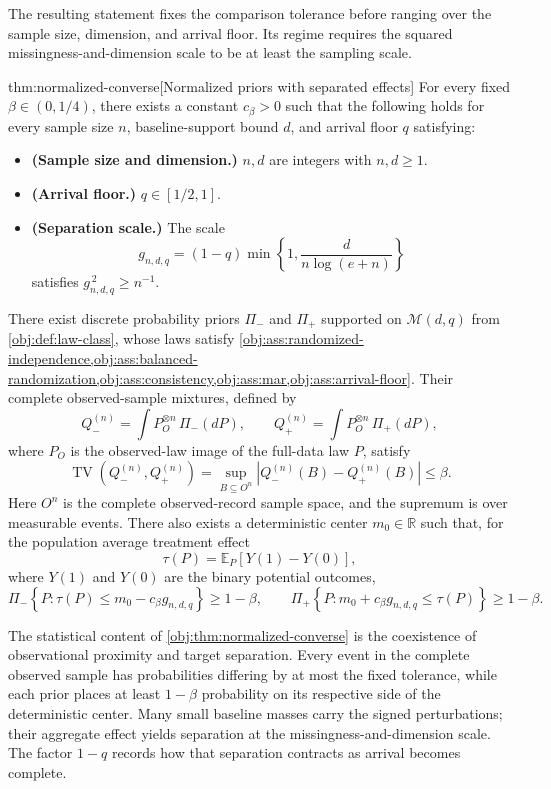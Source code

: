 \documentclass[11pt]{article}
\begin{document}
The resulting statement fixes the comparison tolerance  before ranging over the sample size, dimension, and arrival floor. Its regime requires the squared missingness-and-dimension scale to be at least the sampling scale.

\begin{theoremv}{thm:normalized-converse}[Normalized priors with separated effects]
For every fixed \(\beta\in(0,1/4)\), there exists a constant \(c_\beta>0\) such that the following holds for every sample size \(n\), baseline-support bound \(d\), and arrival floor \(q\) satisfying:
\begin{itemize}
\item \textbf{(Sample size and dimension.)} \(n,d\) are integers with \(n,d\ge1\).
\item \textbf{(Arrival floor.)} \(q\in[1/2,1]\).
\item \textbf{(Separation scale.)} The scale
\[
g_{n,d,q}=(1-q)\min\left\{1,\frac{d}{n\log(e+n)}\right\}
\]
satisfies \(g_{n,d,q}^{\,2}\ge n^{-1}\).
\end{itemize}
There exist discrete probability priors \(\Pi_-\) and \(\Pi_+\) supported on \(\mathcal M(d,q)\) from \cref{obj:def:law-class}, whose laws satisfy \cref{obj:ass:randomized-independence,obj:ass:balanced-randomization,obj:ass:consistency,obj:ass:mar,obj:ass:arrival-floor}. Their complete observed-sample mixtures, defined by
\[
Q_-^{(n)}=\int P_O^{\otimes n}\,\Pi_-(dP),
\qquad
Q_+^{(n)}=\int P_O^{\otimes n}\,\Pi_+(dP),
\]
where \(P_O\) is the observed-law image of the full-data law \(P\), satisfy
\[
\operatorname{TV}\!\left(Q_-^{(n)},Q_+^{(n)}\right)
=\sup_{B\subseteq O^n}
\left|Q_-^{(n)}(B)-Q_+^{(n)}(B)\right|
\le\beta.
\]
Here \(O^n\) is the complete observed-record sample space, and the supremum is over measurable events. There also exists a deterministic center \(m_0\in\mathbb R\) such that, for the population average treatment effect
\[
\tau(P)=\mathbb E_P\!\left[Y(1)-Y(0)\right],
\]
where \(Y(1)\) and \(Y(0)\) are the binary potential outcomes,
\[
\Pi_-\!\left\{P:\tau(P)\le m_0-c_\beta g_{n,d,q}\right\}\ge1-\beta,
\qquad
\Pi_+\!\left\{P:m_0+c_\beta g_{n,d,q}\le\tau(P)\right\}\ge1-\beta.
\]
\end{theoremv}

The statistical content of \cref{obj:thm:normalized-converse} is the coexistence of observational proximity and target separation. Every event in the complete observed sample has probabilities differing by at most the fixed tolerance, while each prior places at least \(1-\beta\) probability on its respective side of the deterministic center. Many small baseline masses carry the signed perturbations; their aggregate effect yields separation at the missingness-and-dimension scale. The factor \(1-q\) records how that separation contracts as arrival becomes complete.
\end{document}
